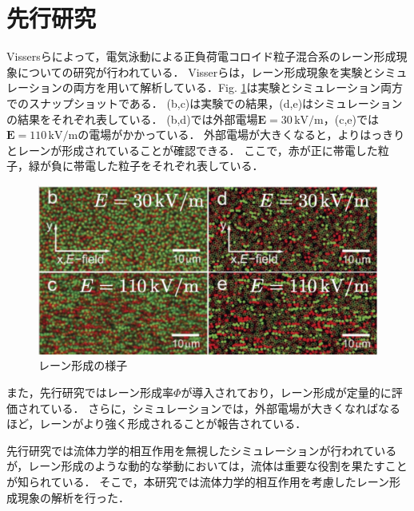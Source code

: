\section{\large 先行研究}
\par Vissersらによって，電気泳動による正負荷電コロイド粒子混合系のレーン形成現象についての研究が行われている\cite{Teun}．
Visserらは，レーン形成現象を実験とシミュレーションの両方を用いて解析している．Fig. \ref{preworksnap}は実験とシミュレーション両方でのスナップショットである．
(b,c)は実験での結果，(d,e)はシミュレーションの結果をそれぞれ表している．
(b,d)では外部電場$\boldsymbol{E}=30\,\textrm{kV/m}$，(c,e)では$\boldsymbol{E}=110\,\textrm{kV/m}$の電場がかかっている．
外部電場が大きくなると，よりはっきりとレーンが形成されていることが確認できる．
ここで，赤が正に帯電した粒子，緑が負に帯電した粒子をそれぞれ表している．
\begin{figure}[H]
\centering
\includegraphics[scale = 0.7]{figures/prework.pdf}
\caption{レーン形成の様子}
\label{preworksnap}
\end{figure}
\noindent
また，先行研究ではレーン形成率$\Phi$が導入されており，レーン形成が定量的に評価されている．
さらに，シミュレーションでは，外部電場が大きくなればなるほど，レーンがより強く形成されることが報告されている．

先行研究では流体力学的相互作用を無視したシミュレーションが行われているが，レーン形成のような動的な挙動においては，流体は重要な役割を果たすことが知られている．
そこで，本研究では流体力学的相互作用を考慮したレーン形成現象の解析を行った．
